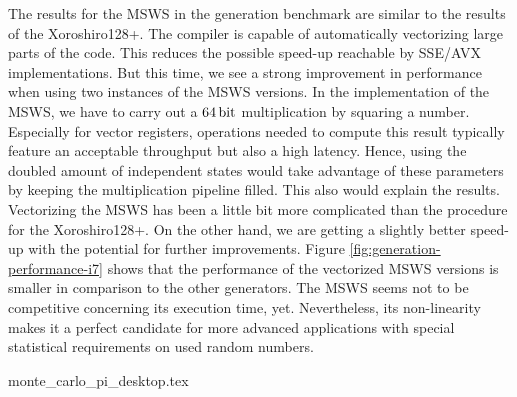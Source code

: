 \documentclass{stdlocal}
\begin{document}
    The results for the MSWS in the generation benchmark are similar to the results of the Xoroshiro128+.
    The compiler is capable of automatically vectorizing large parts of the code.
    This reduces the possible speed-up reachable by SSE/AVX implementations.
    But this time, we see a strong improvement in performance when using two instances of the MSWS versions.
    In the implementation of the MSWS, we have to carry out a $64\, \mathrm{bit}$ multiplication by squaring a number.
    Especially for vector registers, operations needed to compute this result typically feature an acceptable throughput but also a high latency.
    Hence, using the doubled amount of independent states would take advantage of these parameters by keeping the multiplication pipeline filled.
    This also would explain the results.
    Vectorizing the MSWS has been a little bit more complicated than the procedure for the Xoroshiro128+.
    On the other hand, we are getting a slightly better speed-up with the potential for further improvements.
    Figure \ref{fig:generation-performance-i7} shows that the performance of the vectorized MSWS versions is smaller in comparison to the other generators.
    The MSWS seems not to be competitive concerning its execution time, yet.
    Nevertheless, its non-linearity makes it a perfect candidate for more advanced applications with special statistical requirements on used random numbers.

    \begin{table}
      \center
      \caption[Monte Carlo π Benchmark Data for ]{%
        Results achieved by running the Monte Carlo π Benchmark on the  with all implemented variants of given PRNGs and benchmark scenarios.
        While running the benchmark, $10^{8}$ samples in the unit square were used to estimate the value of π.
        It was ensured that the estimation error was small enough according to the calculation at the end of section \ref{sub:monte_carlo_integration}.
        During the execution, there were no cache or branch misses.
        The values for cycles, instructions, and IPCs were averaged over the number of samples in the unit square.
      }
      \label{tab:monte-carlo-pi-data-i7}
      \footnotesize
      \renewcommand{\arraystretch}{1.2}
      {monte_carlo_pi_desktop.tex}
    \end{table}
\end{document}
